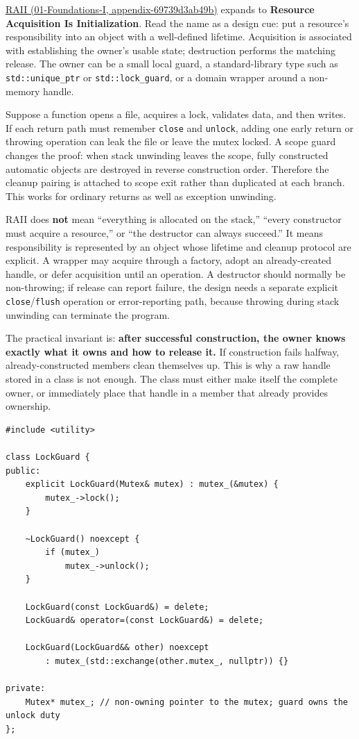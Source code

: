 \href{}{RAII (01-Foundations-I, appendix-69739d3ab49b)} expands to \textbf{Resource Acquisition Is Initialization}. Read the name as a design cue: put a resource's responsibility into an object with a well-defined lifetime. Acquisition is associated with establishing the owner's usable state; destruction performs the matching release. The owner can be a small local guard, a standard-library type such as \texttt{std::unique\_ptr} or \texttt{std::lock\_guard}, or a domain wrapper around a non-memory handle.

Suppose a function opens a file, acquires a lock, validates data, and then writes. If each return path must remember \texttt{close} and \texttt{unlock}, adding one early return or throwing operation can leak the file or leave the mutex locked. A scope guard changes the proof: when stack unwinding leaves the scope, fully constructed automatic objects are destroyed in reverse construction order. Therefore the cleanup pairing is attached to scope exit rather than duplicated at each branch. This works for ordinary returns as well as exception unwinding.

RAII does \textbf{not} mean ``everything is allocated on the stack,'' ``every constructor must acquire a resource,'' or ``the destructor can always succeed.'' It means responsibility is represented by an object whose lifetime and cleanup protocol are explicit. A wrapper may acquire through a factory, adopt an already-created handle, or defer acquisition until an operation. A destructor should normally be non-throwing; if release can report failure, the design needs a separate explicit \texttt{close}/\texttt{flush} operation or error-reporting path, because throwing during stack unwinding can terminate the program.

The practical invariant is: \textbf{after successful construction, the owner knows exactly what it owns and how to release it.} If construction fails halfway, already-constructed members clean themselves up. This is why a raw handle stored in a class is not enough. The class must either make itself the complete owner, or immediately place that handle in a member that already provides ownership.

\begin{verbatim}
#include <utility>

class LockGuard {
public:
    explicit LockGuard(Mutex& mutex) : mutex_(&mutex) {
        mutex_->lock();
    }

    ~LockGuard() noexcept {
        if (mutex_)
            mutex_->unlock();
    }

    LockGuard(const LockGuard&) = delete;
    LockGuard& operator=(const LockGuard&) = delete;

    LockGuard(LockGuard&& other) noexcept
        : mutex_(std::exchange(other.mutex_, nullptr)) {}

private:
    Mutex* mutex_; // non-owning pointer to the mutex; guard owns the unlock duty
};
\end{verbatim}

